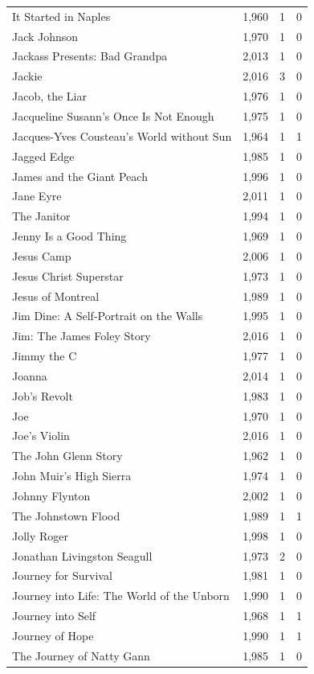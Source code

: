 \begin{tabular}{lrrr}
It Started in Naples & 1,960 & 1 & 0 \\
Jack Johnson & 1,970 & 1 & 0 \\
Jackass Presents: Bad Grandpa & 2,013 & 1 & 0 \\
Jackie & 2,016 & 3 & 0 \\
Jacob, the Liar & 1,976 & 1 & 0 \\
Jacqueline Susann's Once Is Not Enough & 1,975 & 1 & 0 \\
Jacques-Yves Cousteau's World without Sun & 1,964 & 1 & 1 \\
Jagged Edge & 1,985 & 1 & 0 \\
James and the Giant Peach & 1,996 & 1 & 0 \\
Jane Eyre & 2,011 & 1 & 0 \\
The Janitor & 1,994 & 1 & 0 \\
Jenny Is a Good Thing & 1,969 & 1 & 0 \\
Jesus Camp & 2,006 & 1 & 0 \\
Jesus Christ Superstar & 1,973 & 1 & 0 \\
Jesus of Montreal & 1,989 & 1 & 0 \\
Jim Dine: A Self-Portrait on the Walls & 1,995 & 1 & 0 \\
Jim: The James Foley Story & 2,016 & 1 & 0 \\
Jimmy the C & 1,977 & 1 & 0 \\
Joanna & 2,014 & 1 & 0 \\
Job's Revolt & 1,983 & 1 & 0 \\
Joe & 1,970 & 1 & 0 \\
Joe's Violin & 2,016 & 1 & 0 \\
The John Glenn Story & 1,962 & 1 & 0 \\
John Muir's High Sierra & 1,974 & 1 & 0 \\
Johnny Flynton & 2,002 & 1 & 0 \\
The Johnstown Flood & 1,989 & 1 & 1 \\
Jolly Roger & 1,998 & 1 & 0 \\
Jonathan Livingston Seagull & 1,973 & 2 & 0 \\
Journey for Survival & 1,981 & 1 & 0 \\
Journey into Life: The World of the Unborn & 1,990 & 1 & 0 \\
Journey into Self & 1,968 & 1 & 1 \\
Journey of Hope & 1,990 & 1 & 1 \\
The Journey of Natty Gann & 1,985 & 1 & 0 \\

\end{tabular}
